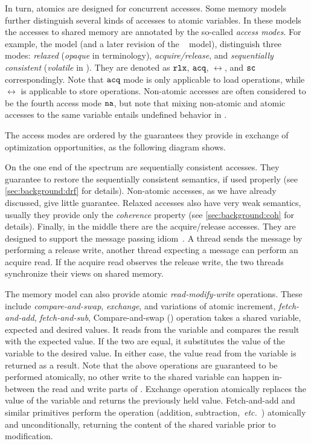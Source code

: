 In turn, atomics are designed for concurrent accesses. 
Some memory models further distinguish 
several kinds of accesses to atomic variables.
In these models the accesses to shared memory are annotated by the 
so-called \emph{access modes}.
For example, the \CPP model (and a later revision of 
the \Java~\cite{Bender-Palsberg:OOPSLA19} model), distinguish 
three modes: \emph{relaxed} (\emph{opaque} in \Java terminology), 
\emph{acquire/release}, and \emph{sequentially consistent}
(\emph{volatile} in \Java).
They are denoted as $\mathtt{rlx}$, ${\mathtt{acq}}$, $\rel$, and ${\mathtt{sc}}$ correspondingly.
Note that ${\mathtt{acq}}$ mode is only applicable to load operations,
while $\rel$ is applicable to store operations.
Non-atomic accesses are often considered to be the fourth access mode $\mathtt{na}$, 
but note that mixing non-atomic and atomic accesses to the same variable 
entails undefined behavior in \CPP.

The access modes are ordered by the guarantees they provide
in exchange of optimization opportunities, as the following 
diagram shows.




On the one end of the spectrum are sequentially consistent accesses. 
They guarantee to restore the sequentially consistent semantics, 
if used properly (see \cref{sec:background:drf} for details).
Non-atomic accesses, as we have already discussed, give little guarantee. 
Relaxed accesses also have very weak semantics, 
usually they provide only the \emph{coherence} property
(see \cref{sec:background:coh} for details).
Finally, in the middle there are the acquire/release accesses. 
They are designed to support the message passing idiom~\cite{Lahav-al:POPL16}.
A thread sends the message by performing a release write, 
another thread expecting a message can perform an acquire read. 
If the acquire read observes the release write, the two 
threads synchronize their views on shared memory. 

The memory model can also provide atomic \emph{read-modify-write} operations.
These include \emph{compare-and-swap}, \emph{exchange}, and variations of atomic increment,
\eg \emph{fetch-and-add}, \emph{fetch-and-sub}, \etc 
Compare-and-swap (\CAS) operation takes a shared variable, expected 
and desired values. It reads from the variable
and compares the result with the expected value. If the two are equal,
it substitutes the value of the variable to the desired value. 
In either case, the value read from the variable is returned as a result. 
Note that the above operations are guaranteed to be performed atomically, 
no other write to the shared variable can happen in-between 
the read and write parts of \CAS.
Exchange operation atomically replaces the value 
of the variable and returns the previously held value.
Fetch-and-add and similar primitives perform 
the operation (addition, subtraction,~\emph{etc.}~)
atomically and unconditionally, returning 
the content of the shared variable prior to modification.

